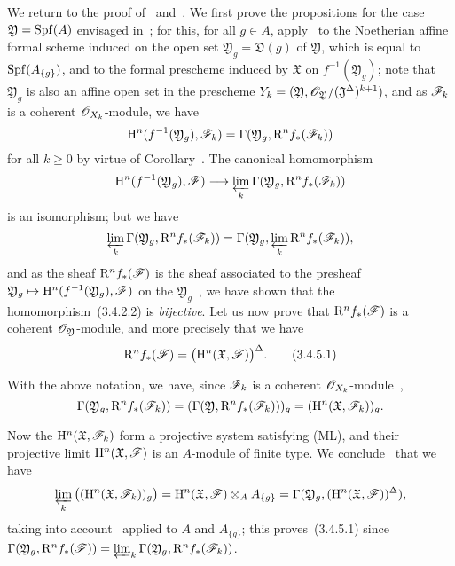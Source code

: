 \begin{env}[3.4.5]
\label{III.3.4.5}
We return to the proof of~ and~.
We first prove the propositions for the case $\mathfrak{Y}=\operatorname{Spf}(A)$ envisaged in~; for this, for all $g\in A$, apply~ to the Noetherian affine formal scheme induced on the open set $\mathfrak{Y}_g=\mathfrak{D}(g)$ of $\mathfrak{Y}$, which is equal to $\operatorname{Spf}(A_{\{g\}})$, and to the formal prescheme induced by $\mathfrak{X}$ on $f^{-1}(\mathfrak{Y}_g)$; note that $\mathfrak{Y}_g$ is also an affine open set in the prescheme $Y_k=(\mathfrak{Y},\mathscr{O}_\mathfrak{Y}/(\mathfrak{J}^\Delta)^{k+1})$, and as $\mathscr{F}_k$ is a coherent $\mathscr{O}_{X_k}$-module, we have
\[
  \mathrm{H}^n(f^{-1}(\mathfrak{Y}_g),\mathscr{F}_k)=\Gamma(\mathfrak{Y}_g,\mathrm{R}^n f_*(\mathscr{F}_k))
\]
for all $k\geq 0$ by virtue of Corollary~.
The canonical homomorphism
\[
  \HH^n(f^{-1}(\mathfrak{Y}_g),\sh{F})\to\varprojlim_k\Gamma(\mathfrak{Y}_g,\RR^n f_*(\sh{F}_k))
\]
is an isomorphism; but we have~
\[
  \varprojlim_k\Gamma(\mathfrak{Y}_g,\mathrm{R}^n f_*(\mathscr{F}_k))=\Gamma(\mathfrak{Y}_g,\varprojlim_k\mathrm{R}^n f_*(\mathscr{F}_k)),
\]
and as the sheaf $\mathrm{R}^n f_*(\mathscr{F})$ is the sheaf associated to the presheaf $\mathfrak{Y}_g\mapsto\HH^n(f^{-1}(\mathfrak{Y}_g),\sh{F})$ on the $\mathfrak{Y}_g$~, we have shown that the homomorphism~(3.4.2.2) is \emph{bijective}.
Let us now prove that $\mathrm{R}^n f_*(\mathscr{F})$ is a coherent $\mathscr{O}_\mathfrak{Y}$-module, and more precisely that we have
\[
\label{III.3.4.5.1}
  \mathrm{R}^n f_*(\mathscr{F})=\big(\mathrm{H}^n(\mathfrak{X},\mathscr{F})\big)^\Delta.
  \tag{3.4.5.1}
\]

With the above notation, we have, since $\mathscr{F}_k$ is a coherent $\mathscr{O}_{X_k}$-module~,
\[
  \Gamma(\mathfrak{Y}_g,\mathrm{R}^n f_*(\mathscr{F}_k))=(\Gamma(\mathfrak{Y},\mathrm{R}^n f_*(\mathscr{F}_k)))_g=(\mathrm{H}^n(\mathfrak{X},\mathscr{F}_k))_g.
\]

Now the $\mathrm{H}^n(\mathfrak{X},\mathscr{F}_k)$ form a projective system satisfying (ML), and their projective limit $\mathrm{H}^n(\mathfrak{X},\mathscr{F})$ is an $A$-module of finite type.
We conclude~ that we have
\[
  \varprojlim_k\big((\mathrm{H}^n(\mathfrak{X},\mathscr{F}_k))_g\big)=\mathrm{H}^n(\mathfrak{X},\mathscr{F})\otimes_A A_{\{g\}}=\Gamma(\mathfrak{Y}_g,(\mathrm{H}^n(\mathfrak{X},\mathscr{F}))^\Delta),
\]
taking into account~ applied to $A$ and $A_{\{g\}}$; this proves~(3.4.5.1) since $\Gamma(\mathfrak{Y}_g,\mathrm{R}^n f_*(\mathscr{F}))=\varprojlim_k\Gamma(\mathfrak{Y}_g,\mathrm{R}^n f_*(\mathscr{F}_k))$.


\end{env}
